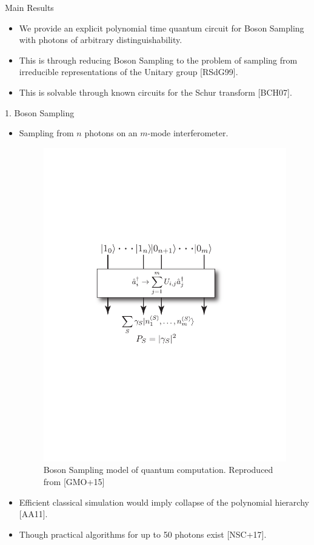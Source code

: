 \documentclass[]{templates/poster}
\begin{document}

\begin{frame}{} 

\begin{columns}[t]
  \begin{column}{0.422\linewidth}
  \begin{block}{\Large Main Results}
  \begin{itemize}
  \item We provide an explicit polynomial time quantum circuit for Boson Sampling with photons of arbitrary distinguishability.
  
  \item This is through reducing Boson Sampling to the problem of sampling from irreducible representations of the Unitary group [RSdG99].
  
  \item This is solvable through known circuits for the Schur transform [BCH07].
  \end{itemize}
  \end{block}

  \begin{block}{\Large 1. Boson Sampling}
  \begin{itemize}
  \item Sampling from $n$ photons on an $m$-mode interferometer.
  \begin{center}
  \begin{figure}
  \includegraphics[width=0.4\linewidth]{model}
  \caption{\label{fig:bs} Boson Sampling model of quantum computation. Reproduced from [GMO+15]}
  \end{figure}
  \end{center}
  \item Efficient classical simulation would imply collapse of the polynomial hierarchy [AA11].
  \item Though practical algorithms for up to 50 photons exist [NSC+17].
  \end{itemize}
  \end{block}


\end{column}
\end{columns}
\end{frame}
\end{document}
